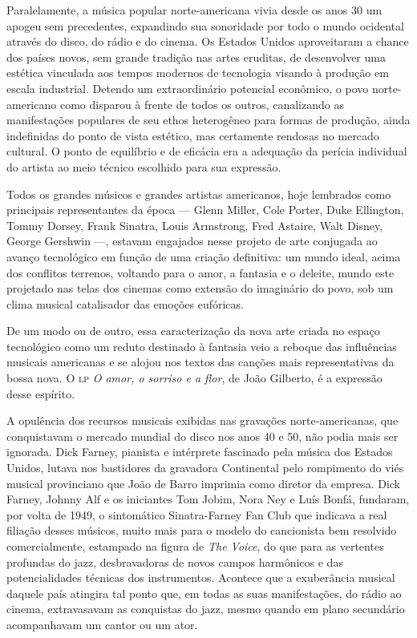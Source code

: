 Paralelamente, a música popular norte-americana vivia desde os anos 30
um apogeu sem precedentes, expandindo sua sonoridade por todo o mundo
ocidental através do disco, do rádio e do cinema. Os Estados Unidos
aproveitaram a chance dos países novos, sem grande tradição nas artes
eruditas, de desenvolver uma estética vinculada aos tempos modernos de
tecnologia visando à produção em escala industrial. Detendo um
extraordinário potencial econômico, o povo norte-americano como disparou
à frente de todos os outros, canalizando as manifestações populares de
seu ethos heterogêneo para formas de produção, ainda indefinidas do
ponto de vista estético, mas certamente rendosas no mercado cultural. O
ponto de equilíbrio e de eficácia era a adequação da perícia individual
do artista ao meio técnico escolhido para sua expressão.

Todos os grandes músicos e grandes artistas americanos, hoje lembrados
como principais representantes da época --- Glenn Miller, Cole Porter, Duke
Ellington, Tommy Dorsey, Frank Sinatra, Louis Armstrong, Fred Astaire,
Walt Disney, George Gershwin ---, estavam engajados nesse projeto de arte
conjugada ao avanço tecnológico em função de uma criação definitiva: um
mundo ideal, acima dos conflitos terrenos, voltando para o amor, a
fantasia e o deleite, mundo este projetado nas telas dos cinemas como
extensão do imaginário do povo, sob um clima musical catalisador das
emoções eufóricas.

De um modo ou de outro, essa caracterização da nova arte criada no
espaço tecnológico como um reduto destinado à fantasia veio a reboque
das influências musicais americanas e se alojou nos textos das canções
mais representativas da bossa nova. O \textsc{lp} \textit{O amor, o sorriso e a flor}, de
João Gilberto, é a expressão desse espírito.

A opulência dos recursos musicais exibidas nas gravações
norte-americanas, que conquistavam o mercado mundial do disco nos anos
40 e 50, não podia mais ser ignorada. Dick Farney, pianista e intérprete
fascinado pela música dos Estados Unidos, lutava nos bastidores da
gravadora Continental pelo rompimento do viés musical provinciano que
João de Barro imprimia como diretor da empresa. Dick Farney, Johnny Alf
e os iniciantes Tom Jobim, Nora Ney e Luís Bonfá, fundaram, por volta de
1949, o sintomático Sinatra-Farney Fan Club que indicava a real filiação
desses músicos, muito mais para o modelo do cancionista bem resolvido
comercialmente, estampado na figura de \textit{The Voice}, do que para as
vertentes profundas do jazz, desbravadoras de novos campos harmônicos e
das potencialidades técnicas dos instrumentos. Acontece que a
exuberância musical daquele país atingira tal ponto que, em todas as
suas manifestações, do rádio ao cinema, extravasavam as conquistas do
jazz, mesmo quando em plano secundário acompanhavam um cantor ou um
ator.

